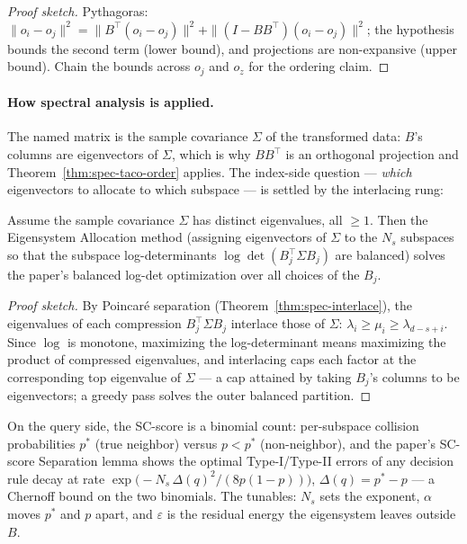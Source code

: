 \begin{proof}[Proof sketch]
Pythagoras: $\|o_i - o_j\|^2 = \|B^{\top}(o_i - o_j)\|^2 + \|(I -
BB^{\top})(o_i-o_j)\|^2$; the hypothesis bounds the second term (lower
bound), and projections are non-expansive (upper bound). Chain the bounds
across $o_j$ and $o_z$ for the ordering claim.
\end{proof}

\paragraph{How spectral analysis is applied.}
The named matrix is the sample covariance $\Sigma$ of the transformed data:
$B$'s columns are eigenvectors of $\Sigma$, which is why $BB^{\top}$ is an
orthogonal projection and Theorem~\ref{thm:spec-taco-order} applies. The
index-side question --- \emph{which} eigenvectors to allocate to which
subspace --- is settled by the interlacing rung:

\begin{theorem}\label{thm:spec-taco-alloc}
Assume the sample covariance $\Sigma$ has distinct eigenvalues, all $\ge 1$.
Then the Eigensystem Allocation method (assigning eigenvectors of $\Sigma$
to the $N_s$ subspaces so that the subspace log-determinants
$\log\det(B_j^{\top}\Sigma B_j)$ are balanced) solves the paper's balanced
log-det optimization over all choices of the $B_j$. \eop
\end{theorem}

\begin{proof}[Proof sketch]
By Poincar\'e separation (Theorem~\ref{thm:spec-interlace}), the eigenvalues
of each compression $B_j^{\top}\Sigma B_j$ interlace those of $\Sigma$:
$\lambda_i \ge \mu_i \ge \lambda_{d-s+i}$. Since $\log$ is monotone,
maximizing the log-determinant means maximizing the product of compressed
eigenvalues, and interlacing caps each factor at the corresponding top
eigenvalue of $\Sigma$ --- a cap attained by taking $B_j$'s columns to be
eigenvectors; a greedy pass solves the outer balanced partition.
\end{proof}

On the query side, the SC-score is a binomial count: per-subspace collision
probabilities $p^*$ (true neighbor) versus $p < p^*$ (non-neighbor), and the
paper's SC-score Separation lemma shows the optimal Type-I/Type-II errors of
any decision rule decay at rate $\exp\bigl(-N_s\,\Delta(q)^2/(8p(1-p))
\bigr)$, $\Delta(q) = p^* - p$ --- a Chernoff bound on the two binomials.
The tunables: $N_s$ sets the exponent, $\alpha$ moves $p^*$ and $p$ apart,
and $\varepsilon$ is the residual energy the eigensystem leaves outside $B$.

